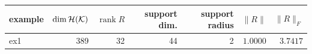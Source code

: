\begin{tabular}{@{}lrrrrrr@{}}
\toprule
example & $\dim\mathcal{H}(\mathcal{K})$ & $\operatorname{rank}R$ & support dim. & support radius & $\|R\|$ & $\|R\|_F$ \\
\midrule
ex1 & 389 & 32 & 44 & 2 & $1.0000$ & $3.7417$ \\
\bottomrule
\end{tabular}
